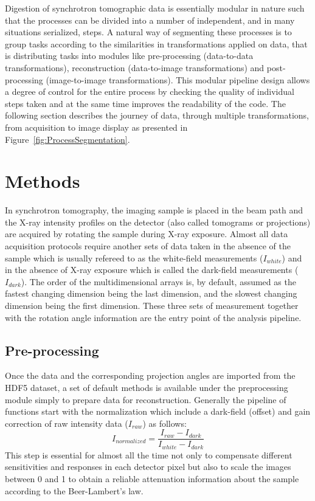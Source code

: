 \documentclass[pdf]{iucr}              %
\begin{document}
Digestion of synchrotron tomographic data is essentially modular in nature such that the processes can be divided into a number of independent, and in many situations serialized, steps. A natural way of segmenting these processes is to group tasks according to the similarities in transformations applied on data, that is distributing tasks into modules like pre-processing (data-to-data transformations), reconstruction (data-to-image transformations) and post-processing (image-to-image transformations). This modular pipeline design allows a degree of control for the entire process by checking the quality of individual steps taken and at the same time improves the readability of the code. The following section describes the journey of data, through multiple transformations, from acquisition to image display as presented in Figure~\ref{fig:ProcessSegmentation}.


\section{Methods} 

In synchrotron tomography, the imaging sample is placed in the beam path and the X-ray intensity profiles on the detector (also called tomograms or projections) are acquired by rotating the sample during X-ray exposure. Almost all data acquisition protocols require another sets of data taken in the absence of the sample which is usually refereed to as the white-field measurements ($I_{white}$) and in the absence of X-ray exposure which is called the dark-field measurements ($I_{dark}$). The order of the multidimensional arrays is, by default, assumed as the fastest changing dimension being the last dimension, and the slowest changing dimension being the first dimension. These three sets of measurement together with the rotation angle information are the entry point of the analysis pipeline.

\subsection{Pre-processing} 

Once the data and the corresponding projection angles are imported from the HDF5 dataset, a set of default methods is available under the preprocessing module simply to prepare data for reconstruction. Generally the pipeline of functions start with the normalization which include a dark-field (offset) and gain correction of raw intensity data ($I_{raw}$) as follows:
\begin{equation}
I_{normalized}=\frac{I_{raw}-I_{dark}}{I_{white}-I_{dark}}
\end{equation}
This step is essential for almost all the time not only to compensate different sensitivities and responses in each detector pixel but also to scale the images between 0 and 1 to obtain a reliable attenuation information about the sample according to the Beer-Lambert's law. 
\end{document}

